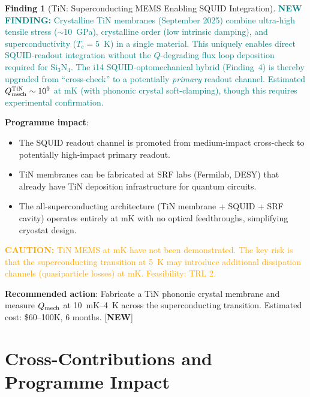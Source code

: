 \documentclass[11pt]{article}
\newcommand{\Qmech}{Q_{\rm mech}}
\newcommand{\caution}[1]{\textcolor{orange}{\textbf{CAUTION:} #1}}
\newcommand{\newfinding}[1]{\textcolor{teal}{\textbf{NEW FINDING:} #1}}
\theoremstyle{definition}
\newtheorem{finding}[theorem]{Finding}
\theoremstyle{remark}
\begin{document}
\begin{finding}[TiN: Superconducting MEMS Enabling SQUID Integration]
\label{find:TiN}
\newfinding{Crystalline TiN membranes (September 2025) combine
ultra-high tensile stress ($\sim 10$~GPa), crystalline order (low
intrinsic damping), and superconductivity ($T_c = 5$~K) in a
single material. This uniquely enables direct SQUID-readout
integration without the $Q$-degrading flux loop deposition required
for Si$_3$N$_4$. The i14 SQUID-optomechanical hybrid (Finding~4)
is thereby upgraded from ``cross-check'' to a potentially
\emph{primary} readout channel. Estimated $\Qmech^{\rm TiN}
\sim 10^9$ at mK (with phononic crystal soft-clamping), though
this requires experimental confirmation.}

\textbf{Programme impact}:
\begin{itemize}[nosep]
\item The SQUID readout channel is promoted from medium-impact
  cross-check to potentially high-impact primary readout.
\item TiN membranes can be fabricated at SRF labs (Fermilab,
  DESY) that already have TiN deposition infrastructure for
  quantum circuits.
\item The all-superconducting architecture (TiN membrane +
  SQUID + SRF cavity) operates entirely at mK with no optical
  feedthroughs, simplifying cryostat design.
\end{itemize}

\caution{TiN MEMS at mK have not been demonstrated. The key
risk is that the superconducting transition at 5~K may introduce
additional dissipation channels (quasiparticle losses) at mK.
Feasibility: TRL 2.}

\textbf{Recommended action}: Fabricate a TiN phononic crystal
membrane and measure $\Qmech$ at 10~mK--4~K across the
superconducting transition. Estimated cost: \$60--100K, 6 months.
[\textbf{NEW}]
\end{finding}


\part{Cross-Contributions and Programme Impact}
\label{part:cross}
\end{document}
